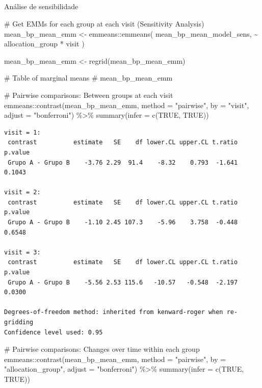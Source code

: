 \documentclass[
  12pt,
]{article}
\makeatletter
\let\oldsubparagraph\subparagraph
\renewcommand{\subparagraph}{
    \@ifstar
      \xxxSubParagraphStar
      \xxxSubParagraphNoStar
  }
\newcommand{\xxxSubParagraphStar}[1]{\oldsubparagraph*{#1}\mbox{}}
\newcommand{\xxxSubParagraphNoStar}[1]{\oldsubparagraph{#1}\mbox{}}
\newenvironment{Shaded}{\begin{snugshade}}{\end{snugshade}}
\newcommand{\AttributeTok}[1]{\textcolor[rgb]{0.40,0.45,0.13}{#1}}
\newcommand{\CommentTok}[1]{\textcolor[rgb]{0.37,0.37,0.37}{#1}}
\newcommand{\ConstantTok}[1]{\textcolor[rgb]{0.56,0.35,0.01}{#1}}
\newcommand{\FunctionTok}[1]{\textcolor[rgb]{0.28,0.35,0.67}{#1}}
\newcommand{\NormalTok}[1]{\textcolor[rgb]{0.00,0.23,0.31}{#1}}
\newcommand{\OtherTok}[1]{\textcolor[rgb]{0.00,0.23,0.31}{#1}}
\newcommand{\SpecialCharTok}[1]{\textcolor[rgb]{0.37,0.37,0.37}{#1}}
\newcommand{\StringTok}[1]{\textcolor[rgb]{0.13,0.47,0.30}{#1}}
\makeatother
\begin{document}
\subparagraph{Análise de
sensibilidade}\label{anuxe1lise-de-sensibilidade-15}

\begin{Shaded}
\begin{Highlighting}[]
\CommentTok{\# Get EMMs for each group at each visit (Sensitivity Analysis)}
\NormalTok{mean\_bp\_mean\_emm }\OtherTok{\textless{}{-}}\NormalTok{ emmeans}\SpecialCharTok{::}\FunctionTok{emmeans}\NormalTok{(}
\NormalTok{    mean\_bp\_mean\_model\_sens, }
    \SpecialCharTok{\textasciitilde{}}\NormalTok{ allocation\_group }\SpecialCharTok{*}\NormalTok{ visit}
\NormalTok{)}

\NormalTok{mean\_bp\_mean\_emm }\OtherTok{\textless{}{-}} \FunctionTok{regrid}\NormalTok{(mean\_bp\_mean\_emm)}

\CommentTok{\# Table of marginal means}
\CommentTok{\# mean\_bp\_mean\_emm}

\CommentTok{\# Pairwise comparisons: Between groups at each visit}
\NormalTok{emmeans}\SpecialCharTok{::}\FunctionTok{contrast}\NormalTok{(mean\_bp\_mean\_emm,}
\AttributeTok{method =} \StringTok{"pairwise"}\NormalTok{, }\AttributeTok{by =} \StringTok{"visit"}\NormalTok{,}
\AttributeTok{adjust =} \StringTok{"bonferroni"}\NormalTok{) }\SpecialCharTok{\%\textgreater{}\%} \FunctionTok{summary}\NormalTok{(}\AttributeTok{infer =} \FunctionTok{c}\NormalTok{(}\ConstantTok{TRUE}\NormalTok{, }\ConstantTok{TRUE}\NormalTok{))}
\end{Highlighting}
\end{Shaded}

\begin{verbatim}
visit = 1:
 contrast          estimate   SE    df lower.CL upper.CL t.ratio p.value
 Grupo A - Grupo B    -3.76 2.29  91.4    -8.32    0.793  -1.641  0.1043

visit = 2:
 contrast          estimate   SE    df lower.CL upper.CL t.ratio p.value
 Grupo A - Grupo B    -1.10 2.45 107.3    -5.96    3.758  -0.448  0.6548

visit = 3:
 contrast          estimate   SE    df lower.CL upper.CL t.ratio p.value
 Grupo A - Grupo B    -5.56 2.53 115.6   -10.57   -0.548  -2.197  0.0300

Degrees-of-freedom method: inherited from kenward-roger when re-gridding 
Confidence level used: 0.95 
\end{verbatim}

\begin{Shaded}
\begin{Highlighting}[]
\CommentTok{\# Pairwise comparisons: Changes over time within each group}
\NormalTok{emmeans}\SpecialCharTok{::}\FunctionTok{contrast}\NormalTok{(mean\_bp\_mean\_emm,}
\AttributeTok{method =} \StringTok{"pairwise"}\NormalTok{, }\AttributeTok{by =} \StringTok{"allocation\_group"}\NormalTok{,}
\AttributeTok{adjust =} \StringTok{"bonferroni"}\NormalTok{) }\SpecialCharTok{\%\textgreater{}\%} \FunctionTok{summary}\NormalTok{(}\AttributeTok{infer =} \FunctionTok{c}\NormalTok{(}\ConstantTok{TRUE}\NormalTok{, }\ConstantTok{TRUE}\NormalTok{))}
\end{Highlighting}
\end{Shaded}
\end{document}
